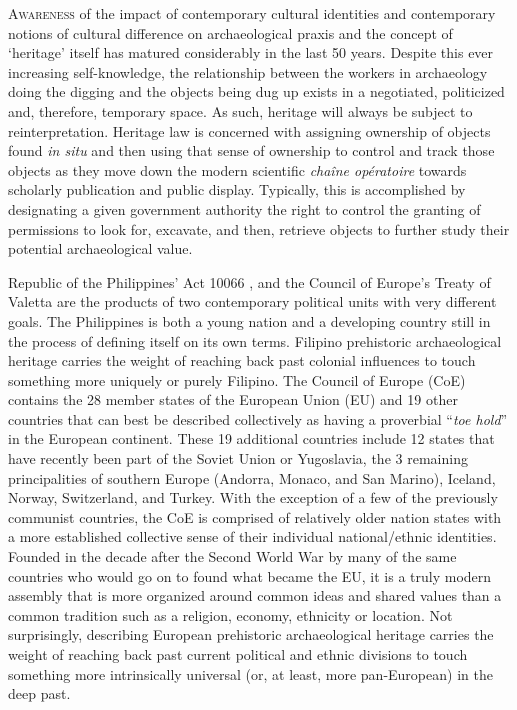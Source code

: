 \documentclass[english]{ijsra}
\begin{document}
\IJSRAopening



\lettrine{A}{wareness} of the impact of contemporary cultural identities and contemporary notions of cultural difference on archaeological praxis and the concept of ‘heritage’ itself has matured considerably in the last 50 years. Despite this ever increasing self-knowledge, the relationship between the workers in archaeology  doing the digging and the objects being dug up exists in a negotiated, politicized and, therefore, temporary space. As such, heritage will always be subject to reinterpretation. Heritage law is concerned with assigning ownership of objects found \textit{in situ} and then using that sense of ownership to control and track those objects as they move down the modern scientific \textit{chaîne opératoire} towards scholarly publication and public display. Typically, this is accomplished by designating a given government authority the right to control the granting of permissions to look for, excavate, and then, retrieve objects to further study their potential archaeological value.

Republic of the Philippines’ Act 10066 \parencite{RA10066}, and the Council of Europe’s Treaty of Valetta \parencite{Valetta_1992} are the products of two contemporary political units with very different goals. The Philippines is both a young nation and a developing country still in the process of defining itself on its own terms. 
Filipino prehistoric archaeological heritage carries the weight of reaching back past colonial influences to touch something more uniquely or purely Filipino. The Council of Europe (CoE) contains the 28 member states of the European Union (EU) and 19 other countries that can best be described collectively as having a proverbial “\textit{toe hold}” in the European continent. 
These 19 additional countries include 12 states that have recently been part of the Soviet Union or Yugoslavia, the 3 remaining principalities of southern Europe (Andorra, Monaco, and San Marino), Iceland, Norway, Switzerland, and Turkey.  With the exception of a few of the previously communist countries, the CoE is comprised of relatively older nation states with a more established collective sense of their individual national/ethnic identities. Founded in the decade after the Second World War by many of the same countries who would go on to found what became the EU, it is a truly modern assembly that is more organized around common ideas and shared values than a common tradition such as a religion, economy, ethnicity or location. Not surprisingly, describing European prehistoric archaeological heritage carries the weight of reaching back past current political and ethnic divisions to touch something more intrinsically universal (or, at least, more pan-European) in the deep past. 
 
\end{document}
